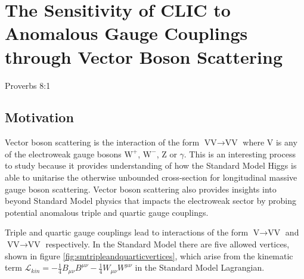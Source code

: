 \chapter{The Sensitivity of CLIC to Anomalous Gauge Couplings through Vector Boson Scattering}
\label{chap:PhysicsAnalysis}

%
{Proverbs 8:1}


\section{Motivation}
Vector boson scattering is the interaction of the form $\text{VV} \rightarrow \text{VV}$ where V is any of the electroweak gauge bosons $\text{W}^{+}$, $\text{W}^{-}$, Z or $\gamma$.  This is an interesting process to study because it provides understanding of how the Standard Model Higgs is able to unitarise the otherwise unbounded cross-section for longitudinal massive gauge boson scattering.  Vector boson scattering also provides insights into beyond Standard Model physics that impacts the electroweak sector by probing potential anomalous triple and quartic gauge couplings.  

Triple and quartic gauge couplings lead to interactions of the form $\text{V} \rightarrow \text{VV}$ and $\text{VV} \rightarrow \text{VV}$ respectively.  In the Standard Model there are five allowed vertices, shown in figure \ref{fig:smtripleandquarticvertices}, which arise from the kinematic term $\mathcal{L}_{kin} = -\frac{1}{4}B_{\mu\nu}B^{\mu\nu} - \frac{1}{4}W_{\mu\nu}W^{\mu\nu}$ in the Standard Model Lagrangian.

